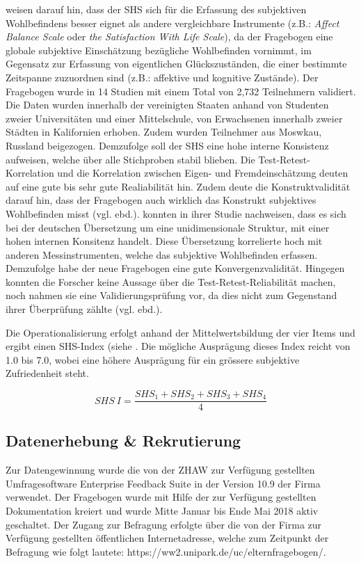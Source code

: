  weisen darauf hin, dass der SHS sich für die Erfassung des subjektiven Wohlbefindens besser eignet als andere vergleichbare Instrumente (z.B.: \textit{Affect Balance Scale} oder \textit{the Satisfaction With Life Scale}), da der Fragebogen eine globale subjektive Einschätzung bezügliche Wohlbefinden vornimmt, im Gegensatz zur Erfassung von eigentlichen Glückszuständen, die einer bestimmte Zeitspanne zuzuordnen sind (z.B.: affektive und kognitive Zustände). Der Fragebogen wurde in 14 Studien mit einem Total von 2,732 Teilnehmern validiert. Die Daten wurden innerhalb der vereinigten Staaten anhand von Studenten zweier Universitäten und einer Mittelschule, von Erwachsenen innerhalb zweier Städten in Kalifornien   erhoben. Zudem wurden Teilnehmer aus Moswkau, Russland beigezogen. Demzufolge soll der SHS eine hohe interne Konsistenz aufweisen, welche über alle Stichproben stabil blieben. Die Test-Retest-Korrelation und die Korrelation zwischen Eigen- und Fremdeinschätzung deuten auf eine gute bis sehr gute Realiabilität hin. 
Zudem deute die Konstruktvalidität darauf hin, dass der Fragebogen auch wirklich das Konstrukt subjektives Wohlbefinden misst (vgl. ebd.).  konnten in ihrer Studie nachweisen, dass es sich bei der deutschen Übersetzung um eine unidimensionale Struktur, mit einer hohen internen Konsitenz handelt. Diese Übersetzung korrelierte hoch mit anderen Messinstrumenten, welche das subjektive Wohlbefinden erfassen. Demzufolge habe der neue Fragebogen eine gute Konvergenzvalidität. Hingegen konnten die Forscher keine Aussage über die Test-Retest-Reliabilität machen, noch nahmen sie eine Validierungsprüfung vor, da dies nicht zum Gegenstand ihrer Überprüfung zählte (vgl. ebd.).

Die Operationalisierung erfolgt anhand der Mittelwertsbildung der vier Items \cite{Lyubomirsky1999} und ergibt einen SHS-Index (siehe . Die mögliche Ausprägung dieses Index reicht von 1.0 bis 7.0, wobei eine höhere Ausprägung für ein grössere subjektive Zufriedenheit steht.

\begin{equation}\label{eq:SHS}
    SHS~I=\frac{SHS_{1}+SHS_{2}+SHS_{3}+SHS_{4}}{4}
\end{equation}

\subsection{Datenerhebung \& Rekrutierung}
Zur Datengewinnung wurde die von der ZHAW zur Verfügung gestellten Umfragesoftware Enterprise Feedback Suite in der Version 10.9 der Firma  verwendet. Der Fragebogen wurde mit Hilfe der zur Verfügung gestellten Dokumentation kreiert \cite{EFS2016} und wurde Mitte Januar bis Ende Mai 2018 aktiv geschaltet.  Der Zugang zur Befragung erfolgte über die von der Firma  zur Verfügung gestellten öffentlichen Internetadresse, welche zum Zeitpunkt der Befragung wie folgt lautete: https://ww2.unipark.de/uc/elternfragebogen/.

